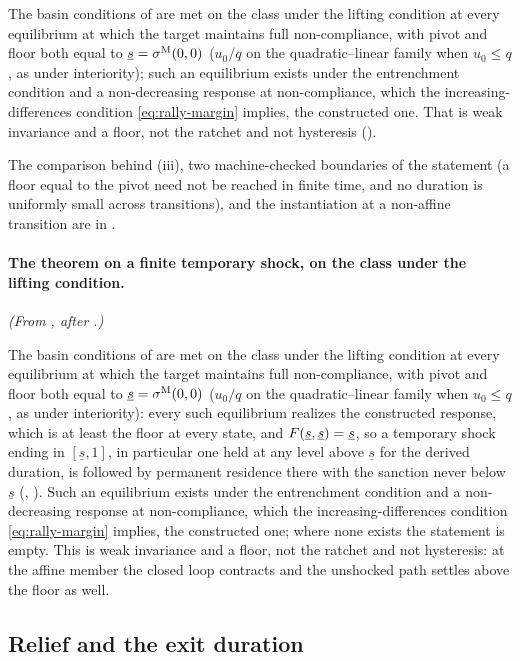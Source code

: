 The basin conditions of  are met on the class under
the lifting condition at every equilibrium at which the target maintains full non-compliance, with pivot and
floor both equal to $\underline s=\sigma^{\mathrm{M}}(0,0)$ ($u_0/q$ on the quadratic--linear family when
$u_0\le q$, as under interiority);
such an equilibrium exists under the entrenchment condition and a non-decreasing
response at non-compliance, which the increasing-differences condition \eqref{eq:rally-margin} implies, the constructed one. That is weak invariance and a floor, not the ratchet and not
hysteresis ().

The comparison behind (iii), two machine-checked boundaries of the statement
(a floor equal to the pivot need not be reached in finite time, and no
duration is uniformly small across transitions), and the instantiation at a
non-affine transition are in .

\paragraph{The theorem on a finite temporary shock, on the class under the lifting condition.} \emph{(From , after .)}

The basin conditions of  are met on the class under
the lifting condition at every equilibrium at which the target maintains full non-compliance, with pivot and
floor both equal to $\underline s=\sigma^{\mathrm{M}}(0,0)$ ($u_0/q$ on the quadratic--linear family when
$u_0\le q$, as under interiority):
every such equilibrium realizes the constructed response, which is at least
the floor at every state, and $F(\underline s,\underline s)=\underline s$, so
a temporary shock ending in $[\underline s,1]$, in particular one held at
any level above $\underline s$ for the derived duration, is followed by
permanent residence there with the sanction never below $\underline s$
(,
). Such an equilibrium exists
under the entrenchment condition and a non-decreasing response at non-compliance, which
the increasing-differences condition \eqref{eq:rally-margin} implies, the constructed one; where
none exists the statement is empty. This is weak invariance and a
floor, not the ratchet and not hysteresis: at the affine member the closed
loop contracts and the unshocked path settles above the floor as well.

\subsection{Relief and the exit duration}
\label{sec:relief-exit}

